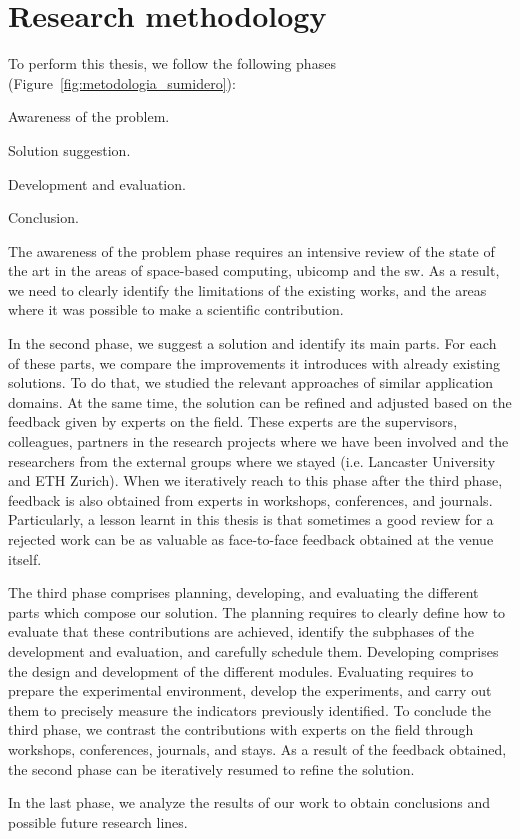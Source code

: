\section{Research methodology}

To perform this thesis, we follow the following phases (Figure~\ref{fig:metodologia_sumidero}):
\begin{enumerate*}[label=\itshape\alph*\upshape)]
  \item Awareness of the problem.
  \item Solution suggestion.
  \item Development and evaluation.
  \item Conclusion.
\end{enumerate*}


The awareness of the problem phase requires an intensive review of the state of the art in the areas of
space-based computing, \acl{ubicomp} and the \acl{sw}.
As a result, we need to clearly identify the limitations of the existing works,
and the areas where it was possible to make a scientific contribution.


In the second phase, we suggest a solution and identify its main parts.
For each of these parts, we compare the improvements it introduces with already existing solutions.
To do that, we studied the relevant approaches of similar application domains.
At the same time, the solution can be refined and adjusted based on the feedback given by experts on the field.
These experts are the supervisors, colleagues, partners in the research projects where we have been involved and the researchers from the external groups where we stayed (i.e. Lancaster University and ETH Zurich). %
When we iteratively reach to this phase after the third phase, feedback is also obtained from experts in workshops, conferences, and journals.
Particularly, a lesson learnt in this thesis is that sometimes a good review for a rejected work can be as valuable as face-to-face feedback obtained at the venue itself. %


The third phase comprises planning, developing, and evaluating the different parts which compose our solution.
The planning requires to clearly define how to evaluate that these contributions are achieved, identify the subphases of the development and evaluation, and carefully schedule them.
Developing comprises the design and development of the different modules.
Evaluating requires to prepare the experimental environment, develop the experiments, and carry out them to precisely measure the indicators previously identified. %
To conclude the third phase, we contrast the contributions with experts on the field through workshops, conferences, journals, and stays.
As a result of the feedback obtained, the second phase can be iteratively resumed to refine the solution.


In the last phase, we analyze the results of our work to obtain conclusions and possible future research lines.

